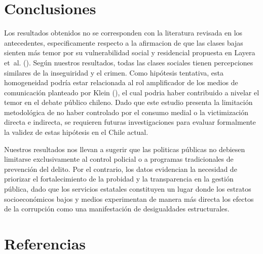 \documentclass[
  spanish,
  a4paper,
  oneside]{scrbook}
\begin{document}

\chapter{Conclusiones}\label{conclusiones}

Los resultados obtenidos no se corresponden con la literatura revisada
en los antecedentes, especificamente respecto a la afirmacion de que las
clases bajas sienten más temor por su vulnerabilidad social y
residencial propuesta en Layera et~al.
(). Según
nuestros resultados, todas las clases sociales tienen percepciones
similares de la inseguiridad y el crimen. Como hipótesis tentativa, esta
homogeneidad podría estar relacionada al rol amplificador de los medios
de comunicación planteado por Klein
(), el cual podria haber
contribuido a nivelar el temor en el debate público chileno. Dado que
este estudio presenta la limitación metodológica de no haber controlado
por el consumo medial o la victimización directa e indirecta, se
requieren futuras investigaciones para evaluar formalmente la validez de
estas hipótesis en el Chile actual.

Nuestros resultados nos llevan a sugerir que las politicas públicas no
debiesen limitarse exclusivamente al control policial o a programas
tradicionales de prevención del delito. Por el contrario, los datos
evidencian la necesidad de priorizar el fortalecimiento de la probidad y
la transparencia en la gestión pública, dado que los servicios estatales
constituyen un lugar donde los estratos socioeconómicos bajos y medios
experimentan de manera más directa los efectos de la corrupción como una
manifestación de desigualdades estructurales.


\chapter{Referencias}\label{referencias}
\end{document}
